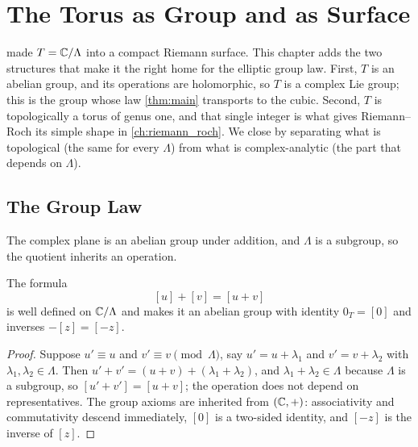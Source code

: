 \chapter{The Torus as Group and as Surface}
\label{ch:torus_group_surface}

 made \(T = \mathbb{C}/\Lambda\) into a compact Riemann surface. This
chapter adds the two structures that make it the right home for the elliptic
group law. First, \(T\) is an abelian group, and its operations are holomorphic,
so \(T\) is a complex Lie group; this is the group whose law \cref{thm:main}
transports to the cubic. Second, \(T\) is topologically a torus of genus one,
and that single integer is what gives Riemann--Roch its simple shape in
\cref{ch:riemann_roch}. We close by separating what is topological (the same for
every \(\Lambda\)) from what is complex-analytic (the part that depends on
\(\Lambda\)).

\section{The Group Law}
\label{sec:tg-group-law}

The complex plane is an abelian group under addition, and \(\Lambda\) is a
subgroup, so the quotient inherits an operation.

\begin{proposition}
\label{prop:tg-welldef}
The formula
\[
  [u] + [v] = [u + v]
\]
is well defined on \(\mathbb{C}/\Lambda\) and makes it an abelian group with identity
\(0_T = [0]\) and inverses \(-[z] = [-z]\).
\end{proposition}

\begin{proof}
Suppose \(u' \equiv u\) and \(v' \equiv v \pmod \Lambda\), say
\(u' = u + \lambda_1\) and \(v' = v + \lambda_2\) with
\(\lambda_1, \lambda_2 \in \Lambda\). Then
\(u' + v' = (u + v) + (\lambda_1 + \lambda_2)\), and
\(\lambda_1 + \lambda_2 \in \Lambda\) because \(\Lambda\) is a subgroup, so
\([u' + v'] = [u + v]\); the operation does not depend on representatives. The
group axioms are inherited from \((\mathbb{C}, +)\): associativity and commutativity
descend immediately, \([0]\) is a two-sided identity, and \([-z]\) is the
inverse of \([z]\).
\end{proof}

